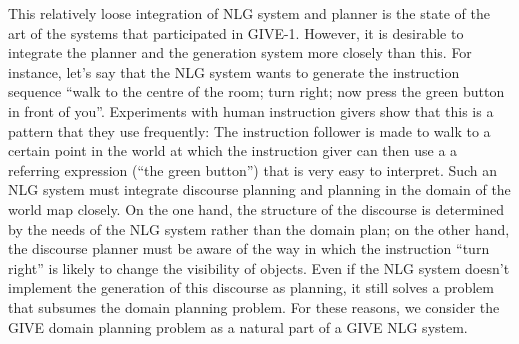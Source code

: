 This relatively loose integration of NLG system and planner is the
state of the art of the systems that participated in GIVE-1. However,
it is desirable to integrate the planner and the generation system
more closely than this. For instance, let's say that the NLG system
wants to generate the instruction sequence ``walk to the centre of the
room; turn right; now press the green button in front of
you''. Experiments with human instruction givers \cite{stoia:08} show
that this is a pattern that they use frequently: The instruction
follower is made to walk to a certain point in the world at which the
instruction giver can then use a a referring expression (``the green
button'') that is very easy to interpret. Such an NLG system must
integrate discourse planning and planning in the domain of the world
map closely. On the one hand, the structure of the discourse is
determined by the needs of the NLG system rather than the domain plan;
on the other hand, the discourse planner must be aware of the way in
which the instruction ``turn right'' is likely to change the
visibility of objects. Even if the NLG system doesn't implement the
generation of this discourse as planning, it still solves a problem
that subsumes the domain planning problem. For these reasons, we
consider the GIVE domain planning problem as a natural part of a GIVE
NLG system.  

